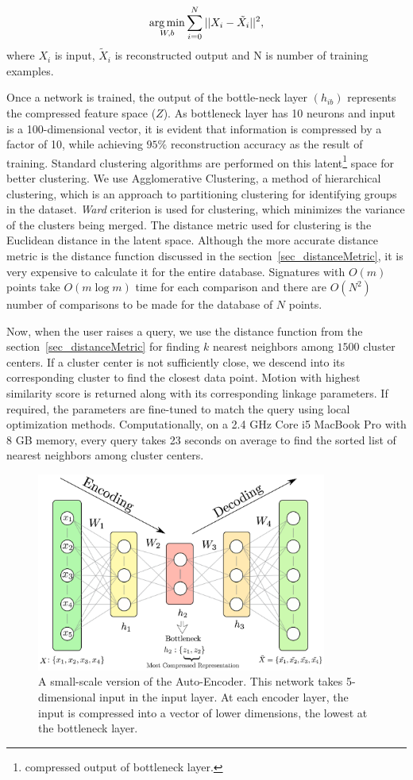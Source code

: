 \begin{equation}\label{nnloss}
  \operatorname*{arg\,min}_{W, b} \sum_{i=0}^{N} || X_i - \tilde{X}_i ||^2,
\end{equation}
where $X_i$ is input, $\tilde{X}_i$ is reconstructed output and N is number of training examples.


Once a network is trained, the output of the bottle-neck layer $(h_{ib})$ represents the compressed feature space ($Z$).
As bottleneck layer has 10 neurons and input is a 100-dimensional vector, it is evident that information is compressed by a factor of 10, while achieving $95\%$ reconstruction accuracy as the result of training.
Standard clustering algorithms are performed on this latent\footnote{compressed output of bottleneck layer.} space for better clustering\cite{song2013}.
We use Agglomerative Clustering, a method of hierarchical clustering, which is an approach to partitioning clustering for identifying groups in the dataset.
\emph{Ward}\cite{ward1963} criterion is used for clustering, which minimizes the variance of the clusters being merged.
The distance metric used for clustering is the Euclidean distance in the latent space.
Although the more accurate distance metric is the distance function discussed in the section~\ref{sec_distanceMetric}, it is very expensive to calculate it for the entire database.
Signatures with ${O}(m)$ points take ${O}(m\log{}m)$ time for each comparison and there are ${O}(N^2)$ number of comparisons to be made for the database of $N$ points.

Now, when the user raises a query, we use the distance function from the section~\ref{sec_distanceMetric} for finding $k$ nearest neighbors among $1500$ cluster centers.
If a cluster center is not sufficiently close, we descend into its corresponding cluster to find the closest data point.
Motion with highest similarity score is returned along with its corresponding linkage parameters.
If required, the parameters are fine-tuned to match the query using local optimization methods.
Computationally, on a 2.4 GHz Core i5 MacBook Pro with 8 GB memory, every query takes 23 seconds on average to find the sorted list of nearest neighbors among cluster centers.

\begin{figure}
\centering
\includegraphics[width=270pt]{jcise-18/figure/fig_auto_encoder.eps}
  \caption{A small-scale version of the Auto-Encoder. This network takes 5-dimensional input in the input layer. At each encoder layer, the input is compressed into a vector of lower dimensions, the lowest at the bottleneck layer.}
\label{autoEncoder}
\end{figure}


